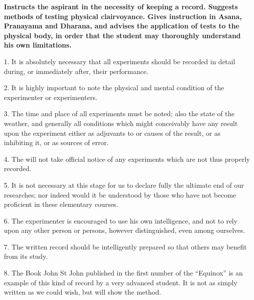 \textbf{Instructs the aspirant in the necessity of keeping a record. Suggests methods of testing physical clairvoyance. Gives instruction in Asana, Pranayama and Dharana, and advises the application of tests to the physical body, in order that the student may thoroughly understand his own limitations.}



1. It is absolutely necessary that all experiments should be recorded in detail during, or immediately after, their performance.

2. It is highly important to note the physical and mental condition of the experimenter or experimenters.

3. The time and place of all experiments must be noted; also the state of the weather, and generally all conditions which might conceivably have any result upon the experiment either as adjuvants to or causes of the result, or as inhibiting it, or as sources of error.

4. The \Argentium{} will not take official notice of any experiments which are not thus properly recorded.

5. It is not necessary at this stage for us to declare fully the ultimate end of our researches; nor indeed would it be understood by those who have not become proficient in these elementary courses.

6. The experimenter is encouraged to use his own intelligence, and not to rely upon any other person or persons, however distinguished, even among ourselves.

7. The written record should be intelligently prepared so that others may benefit from its study.

8. The Book John St John published in the first number of the \enquote{Equinox} is an example of this kind of record by a very advanced student. It is not as simply written as we could wish, but will show the method.

